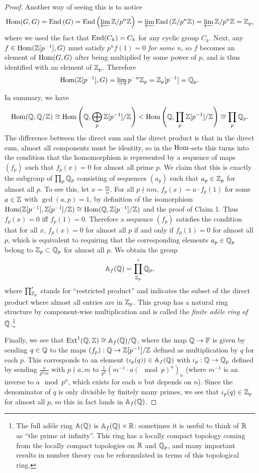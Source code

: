 \begin{proof}
    Another way of seeing this is to notice
    \[\operatorname{Hom}(G,G)=\operatorname{End}\left(G\right)=\operatorname{End}\left(\varprojlim \mathbb{Z}\slash p^n\mathbb{Z} \right)=\varprojlim \operatorname{End}\left(\mathbb{Z}\slash p^n\mathbb{Z} \right)=\varprojlim \mathbb{Z}\slash p^n\mathbb{Z}=\mathbb{Z}_p,\]
    where we used the fact that $\operatorname{End}(C_k)=C_k$ for any cyclic group $C_k$. Next, any $f\in \operatorname{Hom}(\mathbb{Z}[p^{-1}],G)$ must satisfy $p^nf(1)=0$ \emph{for some $n$}, so $f$ becomes an element of $\operatorname{Hom}(G,G)$ after being multiplied by some power of $p$, and is thus identified with an element of $\mathbb{Z}_p$. Therefore
    \[\operatorname{Hom}(\mathbb{Z}[p^{-1}],G)=\varinjlim p^{-n}\mathbb{Z}_p=\mathbb{Z}_p[p^{-1}]=\mathbb{Q}_p.\]

    In summary, we have
    \[\operatorname{Hom}(\mathbb{Q},\mathbb{Q}\slash\mathbb{Z})\cong \operatorname{Hom}\left(\mathbb{Q},\bigoplus_p \mathbb{Z}[p^{-1}]\slash \mathbb{Z}\right)< \operatorname{Hom}\left(\mathbb{Q},\prod_p \mathbb{Z}[p^{-1}]\slash \mathbb{Z}\right)\cong \prod_p \mathbb{Q}_p.\]
    The difference between the direct sum and the direct product is that in the direct sum, almost all components must be identity, so in the $\operatorname{Hom}$-sets this turns into the condition that the homomorphism is represented by a sequence of maps $(f_p)$ such that $f_p(x)=0$ for almost all prime $p$. We claim that this is exactly the subgroup of $\prod_p\mathbb{Q}_p$ consisting of sequences $(a_p)$ such that $a_p\in\mathbb{Z}_p$ for almost all $p$. To see this, let $x=\frac mn$. For all $p\nmid nm$, $f_p(x)=a\cdot f_p(1)$ for some $a\in\mathbb{Z}$ with $\gcd(a,p)=1$, by definition of the isomorphism $\operatorname{Hom}(\mathbb{Z}[p^{-1}],\mathbb{Z}[p^{-1}]\slash \mathbb{Z})\cong \operatorname{Hom}(\mathbb{Q},\mathbb{Z}[p^{-1}]\slash\mathbb{Z})$ and the proof of Claim 1. Thus $f_p(x)=0$ iff $f_p(1)=0$. Therefore a sequence $(f_p)$ satisfies the condition that for all $x$, $f_p(x)=0$ for almost all $p$ if and only if $f_p(1)=0$ for almost all $p$, which is equivalent to requiring that the corresponding elements $a_p\in \mathbb{Q}_p$ belong to $\mathbb{Z}_p\subset \mathbb{Q}_p$ for almost all $p$. We obtain the group
    \[\mathbb{A}_f(\mathbb{Q})=\prod_{\mathbb{Z}_p}^\prime \mathbb{Q}_p,\]
    where $\prod^\prime_{\mathbb{Z}_p}$ stands for ``restricted product'' and indicates the subset of the direct product where almost all entries are in $\mathbb{Z}_p$. This group has a natural ring structure by component-wise multiplication and is called the \emph{finite ad\`ele ring of $\mathbb{Q}$}.\footnote{The full ad\`ele ring $\mathbb{A}(\mathbb{Q})$ is $\mathbb{A}_f(\mathbb{Q})\times \mathbb{R}$: sometimes it is useful to think of $\mathbb{R}$ as ``the prime at infinity''. This ring has a locally compact topology coming from the locally compact topologies on $\mathbb{R}$ and $\mathbb{Q}_p$, and many important results in number theory can be reformulated in terms of this topological ring.}
    
    Finally, we see that $\operatorname{Ext}^1(\mathbb{Q},\mathbb{Z})\cong \mathbb{A}_f(\mathbb{Q})\slash \mathbb{Q}$, where the map $\mathbb{Q}\to \mathbb{F}$ is given by sending $q\in\mathbb{Q}$ to the maps $(f_p):\mathbb{Q}\to \mathbb{Z}[p^{-1}]\slash\mathbb{Z}$ defined as multiplication by $q$ for each $p$. This corresponds to an element $(\iota_p(q)) \in \mathbb{A}_f(\mathbb{Q})$ with $\iota_p:\mathbb{Q}\to \mathbb{Q}_p$ defined by sending $\frac{a}{p^k m}$ with $p\nmid a,m$ to $\frac{1}{p^k}\left(m^{-1}\cdot a(\mod p)^n\right)_n$ (where $m^{-1}$ is an inverse to $a \mod p^n$, which exists for each $n$ but depends on $n$). Since the denominator of $q$ is only divisible by finitely many primes, we see that $\iota_p(q)\in\mathbb{Z}_p$ for almost all $p$, so this in fact lands in $\mathbb{A}_f(\mathbb{Q})$. 
\end{proof}
